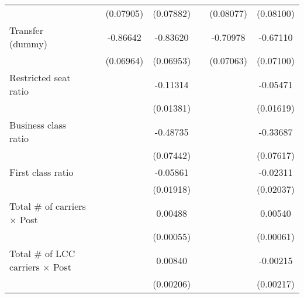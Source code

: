 \begin{table}[htbp]
\begin{tabular}{l*{6}{c}}
                    &                     &   (0.07905)         &   (0.07882)         &                     &   (0.08077)         &   (0.08100)         \\
\addlinespace
\shortstack{Transfer \\ (dummy)}&                     &    -0.86642\sym{***}&    -0.83620\sym{***}&                     &    -0.70978\sym{***}&    -0.67110\sym{***}\\
                    &                     &   (0.06964)         &   (0.06953)         &                     &   (0.07063)         &   (0.07100)         \\
\addlinespace
Restricted seat ratio&                     &                     &    -0.11314\sym{***}&                     &                     &    -0.05471\sym{***}\\
                    &                     &                     &   (0.01381)         &                     &                     &   (0.01619)         \\
\addlinespace
Business class ratio&                     &                     &    -0.48735\sym{***}&                     &                     &    -0.33687\sym{***}\\
                    &                     &                     &   (0.07442)         &                     &                     &   (0.07617)         \\
\addlinespace
First class ratio   &                     &                     &    -0.05861\sym{***}&                     &                     &    -0.02311         \\
                    &                     &                     &   (0.01918)         &                     &                     &   (0.02037)         \\
\addlinespace
Total # of carriers $\times$ Post&                     &                     &     0.00488\sym{***}&                     &                     &     0.00540\sym{***}\\
                    &                     &                     &   (0.00055)         &                     &                     &   (0.00061)         \\
\addlinespace
Total # of LCC carriers $\times$ Post&                     &                     &     0.00840\sym{***}&                     &                     &    -0.00215         \\
                    &                     &                     &   (0.00206)         &                     &                     &   (0.00217)         \\

\end{tabular}
\end{table}
